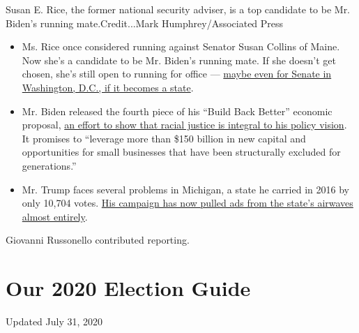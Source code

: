 Susan E. Rice, the former national security adviser, is a top candidate
to be Mr. Biden's running mate.Credit...Mark Humphrey/Associated Press

\begin{itemize}
\item
  Ms. Rice once considered running against Senator Susan Collins of
  Maine. Now she's a candidate to be Mr. Biden's running mate. If she
  doesn't get chosen, she's still open to running for office ---
  \href{https://www.nytimes3xbfgragh.onion/2020/07/27/us/politics/susan-rice-biden-vice-president.html}{maybe
  even for Senate in Washington, D.C., if it becomes a state}.
\item
  Mr. Biden released the fourth piece of his ``Build Back Better''
  economic proposal,
  \href{https://www.nytimes3xbfgragh.onion/2020/07/28/us/politics/joe-biden-racial-justice-economy-plan.html}{an
  effort to show that racial justice is integral to his policy vision}.
  It promises to ``leverage more than \$150 billion in new capital and
  opportunities for small businesses that have been structurally
  excluded for generations.''
\item
  Mr. Trump faces several problems in Michigan, a state he carried in
  2016 by only 10,704 votes.
  \href{http://nytimes3xbfgragh.onion/2020/07/29/us/politics/michigan-trump-biden-2020.html}{His
  campaign has now pulled ads from the state's airwaves almost
  entirely}.
\end{itemize}

Giovanni Russonello contributed reporting.

\hypertarget{our-2020-election-guide}{%
\section{Our 2020 Election Guide}\label{our-2020-election-guide}}

Updated July 31, 2020

